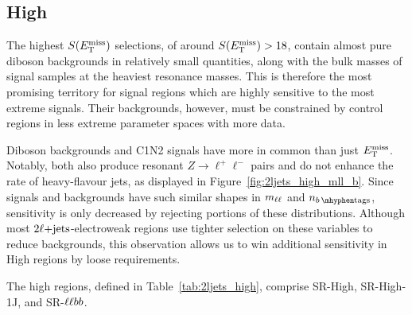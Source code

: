 \FloatBarrier
\subsection{High}
\label{sec:2ljets_high}
The highest $S(E_\mathrm{T}^\mathrm{miss})$ selections, of around $S(E_\mathrm{T}^\mathrm{miss}) > 18$, contain almost pure
diboson backgrounds in relatively small quantities, along with the bulk masses
of signal samples at the heaviest resonance masses.
This is therefore the most promising territory for signal regions which are
highly sensitive to the most extreme signals.
Their backgrounds, however, must be constrained by control regions in less
extreme parameter spaces with more data.

Diboson backgrounds and C1N2 signals have more in common than just $E_\mathrm{T}^\mathrm{miss}$.
Notably, both also produce resonant $Z\rightarrow \ell^+\ell^-$ pairs
and do not enhance the rate of heavy-flavour jets, as displayed in
Figure~\ref{fig:2ljets_high_mll_b}.
Since signals and backgrounds have such similar shapes in $m_{\ell\ell}$ and $\nbtag$,
sensitivity is only decreased by rejecting portions of these distributions.
Although most $2\ell\mathrm{+jets}$-electroweak regions use tighter selection on these
variables to reduce backgrounds, this observation allows us to win
additional sensitivity in High regions by loose requirements.

The high regions, defined in Table~\ref{tab:2ljets_high}, comprise SR-High,
SR-High-1J, and SR-$\ell\ell bb$.

